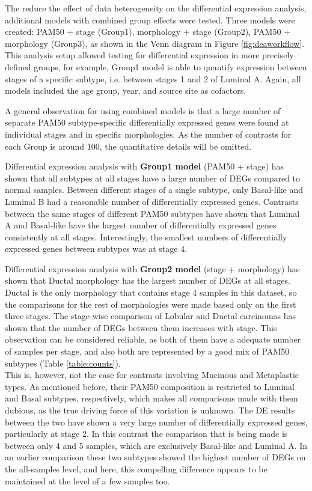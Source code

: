         The reduce the effect of data heterogeneity on the differential expression analysis, additional models with combined group effects were tested. Three models were created: PAM50 + stage (Group1), morphology + stage (Group2), PAM50 + morphology (Group3), as shown in the Venn diagram in Figure \ref{fig:deaworkflow}. This analysis setup allowed testing for differential expression in more precisely defined groups,  for example, Group1 model is able to quantify expression between stages of a specific subtype, i.e. between stages 1 and 2 of Luminal A. Again, all models included the age group, year, and source site as cofactors.

        A general observation for using combined models is that a large number of separate PAM50 subtype-specific differentially expressed genes were found at individual stages and in specific morphologies. As the number of contrasts for each Group is around 100, the quantitative details will be omitted. 
        
        Differential expression analysis with \textbf{Group1 model} (PAM50 + stage) has shown that all subtypes at all stages have a large number of DEGs compared to normal samples. Between different stages of a single subtype, only Basal-like and Luminal B had a reasonable number of differentially expressed genes. Contrasts between the same stages of different PAM50 subtypes have shown that Luminal A and Basal-like have the largest number of differentially expressed genes consistently at all stages. Interestingly, the smallest numbers of differentially expressed genes between subtypes was at stage 4. 
        
        Differential expression analysis with \textbf{Group2 model} (stage + morphology) has shown that Ductal morphology has the largest number of DEGs at all stages. Ductal is the only morphology that contains stage 4 samples in this dataset, so the comparisons for the rest of morphologies were made based only on the first three stages. The stage-wise comparison of Lobular and Ductal carcinomas has shown that the number of DEGs between them increases with stage. This observation can be considered reliable, as both of them have a adequate number of samples per stage, and also both are represented by a good mix of PAM50 subtypes (Table \ref{table:counts}). \\ This is, however, not the case for contrasts involving Mucinous and Metaplastic types. As mentioned before, their PAM50 composition is restricted to Luminal and Basal subtypes, respectively, which makes all comparisons made with them dubious, as the true driving force of this variation is unknown. The DE results between the two have shown a very large number of differentially expressed genes, particularly at stage 2. In this contrast the comparison that is being made is  between only 4 and 5 samples, which are exclusively Basal-like and Luminal A. In an earlier comparison these two subtypes showed the highest number of DEGs on the all-samples level, and here, this compelling difference appears to be maintained at the level of a few samples too. 
        
